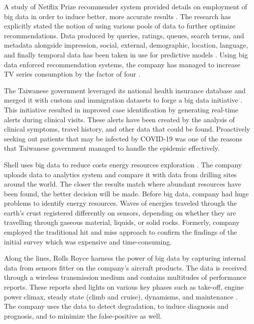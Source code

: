 A study of Netflix Prize recommender system provided details on employment of big data in order to induce better, more accurate results \cite{Amatriain2013}. The research has explicitly stated the notion of using various pools of data to further optimize recommendations. Data produced by queries, ratings, queues, search terms, and metadata alongside impression, social, external, demographic, location, language, and finally temporal data has been taken in use for predictive models \cite{Amatriain2013}. Using big data enforced recommendation systems, the company has managed to increase TV series consumption by the factor of four \cite{Amatriain2013}.

The Taiwanese government leveraged its national health insurance database and merged it with custom and immigration datasets to forge a big data initiative \cite{wang2020response}. This initiative resulted in improved case identification by generating real-time alerts during clinical visits. These alerts have been created by the analysis of clinical symptoms, travel history, and other data that could be found. Proactively seeking out patients that may be infected by COVID-19 was one of the reasons that Taiwanese government managed to handle the epidemic effectively.

Shell uses big data to reduce costs energy resources exploration \cite{Marr2016}. The company uploads data to analytics system and compare it with data from drilling sites around the world. The closer the results match where abundant resources have been found, the better decision will be made. Before big data, company had huge problems to identify energy resources. Waves of energies traveled through the earth’s crust registered differently on sensors, depending on whether they are travelling through gaseous material, liquids, or solid rocks. Formerly, company employed the traditional hit and miss approach to confirm the findings of the initial survey which was expensive and time-consuming.

Along the lines, Rolls Royce harness the power of big data by capturing internal data from sensors fitter on the company’s aircraft products. The data is received through a wireless transmission medium and contains multitudes of performance reports. These reports shed lights on various key phases such as take-off, engine power climax, steady state (climb and cruise), dynamisms, and maintenance \cite{Marr2016}. The company uses the data to detect degradation, to induce diagnosis and prognosis, and to minimize the false-positive as well.

